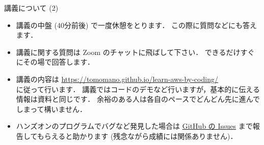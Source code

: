 \documentclass[unicode,11pt]{beamer}
\begin{document}
\begin{frame}{講義について (2)}
\begin{itemize}
    \item 講義の中盤 (40分前後) で一度休憩をとります．
    この際に質問などにも答えます．
    \item 講義に関する質問は Zoom のチャットに飛ばして下さい．
    できるだけすぐにその場で回答します．
    \item 講義の内容は
    \url{https://tomomano.github.io/learn-aws-by-coding/}\\
    に従って行います．
    講義ではコードのデモなど行いますが，基本的に伝える情報は資料と同じです．
    余裕のある人は各自のペースでどんどん先に進んでしまって構いません．
    \item ハンズオンのプログラムでバグなど発見した場合は
    \href{https://github.com/tomomano/learn-aws-by-coding/issues}{GitHub の Issues}
    まで報告してもらえると助かります (残念ながら成績には関係ありません)．
\end{itemize}

\end{frame}
\end{document}
